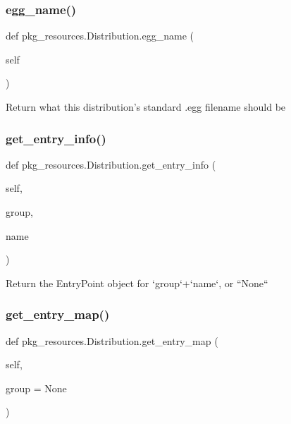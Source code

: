 \subsubsection{\texorpdfstring{egg\+\_\+name()}{egg\_name()}}
{\footnotesize\ttfamily def pkg\+\_\+resources.\+Distribution.\+egg\+\_\+name (\begin{DoxyParamCaption}\item[{}]{self }\end{DoxyParamCaption})}

\begin{DoxyVerb}Return what this distribution's standard .egg filename should be\end{DoxyVerb}
 \mbox{\label{classpkg__resources_1_1_distribution_a2eb224328a194967021953cd6a122011}} 
\subsubsection{\texorpdfstring{get\+\_\+entry\+\_\+info()}{get\_entry\_info()}}
{\footnotesize\ttfamily def pkg\+\_\+resources.\+Distribution.\+get\+\_\+entry\+\_\+info (\begin{DoxyParamCaption}\item[{}]{self,  }\item[{}]{group,  }\item[{}]{name }\end{DoxyParamCaption})}

\begin{DoxyVerb}Return the EntryPoint object for `group`+`name`, or ``None``\end{DoxyVerb}
 \mbox{\label{classpkg__resources_1_1_distribution_a62bf46d7615519b2b455498257f9d536}} 
\subsubsection{\texorpdfstring{get\+\_\+entry\+\_\+map()}{get\_entry\_map()}}
{\footnotesize\ttfamily def pkg\+\_\+resources.\+Distribution.\+get\+\_\+entry\+\_\+map (\begin{DoxyParamCaption}\item[{}]{self,  }\item[{}]{group = {\ttfamily None} }\end{DoxyParamCaption})}

